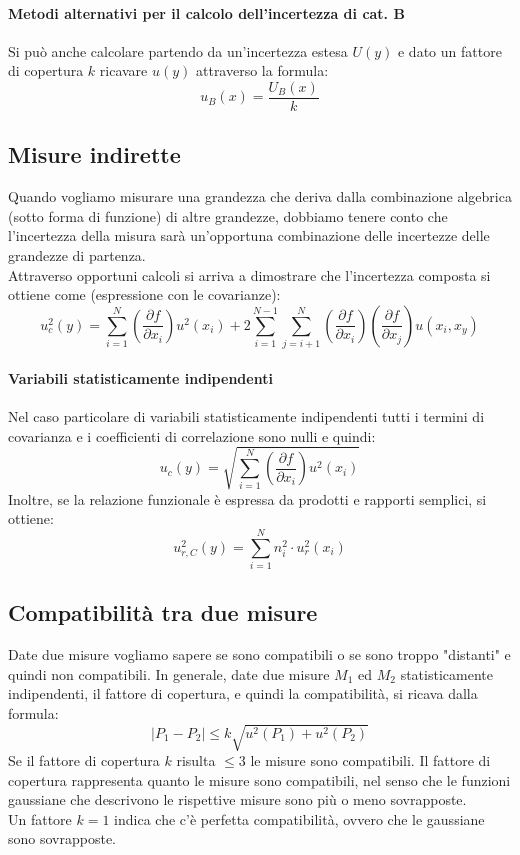 \documentclass{article}
\begin{document}
	\paragraph*{Metodi alternativi per il calcolo dell'incertezza di cat. B}
	Si può anche calcolare partendo da un'incertezza estesa $U(y)$ e dato un fattore di copertura $k$ ricavare $u(y)$ attraverso la formula:
	\begin{equation}
	u_B(x) = \frac{U_B(x)}{k}
	\end{equation}
	\subsection*{Misure indirette}
	Quando vogliamo misurare una grandezza che deriva dalla combinazione algebrica (sotto forma di funzione) di altre grandezze, dobbiamo tenere conto che l'incertezza della misura sarà un'opportuna combinazione delle incertezze delle grandezze di partenza.\\
	Attraverso opportuni calcoli si arriva a dimostrare che l'incertezza composta si ottiene come (espressione con le covarianze):
	\begin{equation}
		u^2_c(y) = \sum_{i=1}^{N} \left( \frac{\partial f}{\partial x_i} \right) u^2(x_i) + 2 \sum_{i=1}^{N-1}\sum_{j=i+1}^{N} \left( \frac{\partial f}{\partial x_i} \right) \left( \frac{\partial f}{\partial x_j} \right) u(x_i, x_y)
	\end{equation}
	\paragraph*{Variabili statisticamente indipendenti}
	Nel caso particolare di variabili statisticamente indipendenti tutti i termini di covarianza e i coefficienti di correlazione sono nulli e quindi:
	\begin{equation}
		u_c(y) = \sqrt{\sum_{i=1}^N \left( \frac{\partial f}{\partial x_i} \right) u^2(x_i)}
	\end{equation}
	Inoltre, se la relazione funzionale è espressa da prodotti e rapporti semplici, si ottiene:
	\begin{equation}
		u^2_{r,C}(y) = \sum_{i=1}^N n^2_i \cdot u^2_r(x_i)
	\end{equation}
	\subsection*{Compatibilità tra due misure}
	Date due misure vogliamo sapere se sono compatibili o se sono troppo "distanti" e quindi non compatibili.
	In generale, date due misure $M_1$ ed $M_2$ statisticamente indipendenti, il fattore di copertura, e quindi la compatibilità, si ricava dalla formula:
	\begin{equation}
		\left|P_1-P_2\right| \leq k \sqrt{u^2(P_1) + u^2(P_2)}
	\end{equation}
	Se il fattore di copertura $k$ risulta $\leq 3$ le misure sono compatibili. Il fattore di copertura rappresenta quanto le misure sono compatibili, nel senso che le funzioni gaussiane che descrivono le rispettive misure sono più o meno sovrapposte.\\ Un fattore $k = 1$ indica che c'è perfetta compatibilità, ovvero che le gaussiane sono sovrapposte.
\end{document}
